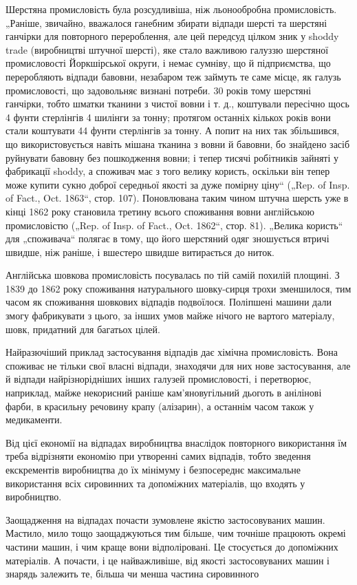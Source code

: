 
Шерстяна промисловість була розсудливіша, ніж льонообробна промисловість. „Раніше, звичайно,
вважалося ганебним
збирати відпади шерсті та шерстяні ганчірки для повторного
перероблення, але цей передсуд цілком зник у shoddy trade
(виробництві штучної шерсті), яке стало важливою галуззю
шерстяної промисловості Йоркшірської округи, і немає сумніву,
що й підприємства, що переробляють відпади бавовни, незабаром теж займуть те саме місце, як галузь
промисловості, що
задовольняє визнані потреби. 30 років тому шерстяні ганчірки,
тобто шматки тканини з чистої вовни і т. д., коштували пересічно щось 4 фунти стерлінгів 4 шилінги
за тонну; протягом
останніх кількох років вони стали коштувати 44 фунти стерлінгів за тонну. А попит на них так
збільшився, що використовується
навіть мішана тканина з вовни й бавовни, бо знайдено засіб
руйнувати бавовну без пошкодження вовни; і тепер тисячі робітників зайняті у фабрикації shoddy, а
споживач має з того
велику користь, оскільки він тепер може купити сукно доброї
середньої якості за дуже помірну ціну“ („Rep. of Insp. of Fact.,
Oct. 1863“, стор. 107). Поновлювана таким чином штучна шерсть
уже в кінці 1862 року становила третину всього споживання
вовни англійською промисловістю („Rep. of Insp. of Fact., Oct.
1862“, стор. 81). „Велика користь“ для „споживача“ полягає в тому,
що його шерстяний одяг зношується втричі швидше, ніж раніше,
і вшестеро швидше витирається до ниток.

Англійська шовкова промисловість посувалась по тій самій
похилій площині. З 1839 до 1862 року споживання натурального
шовку-сирця трохи зменшилося, тим часом як споживання шовкових відпадів подвоїлося. Поліпшені машини
дали змогу фабрикувати з цього, за інших умов майже нічого не вартого матеріалу, шовк, придатний для
багатьох цілей.

Найразючіший приклад застосування відпадів дає хімічна
промисловість. Вона споживає не тільки свої власні відпади,
знаходячи для них нове застосування, але й відпади найрізнорідніших інших галузей промисловості, і
перетворює, наприклад,
майже некорисний раніше кам’яновугільний дьоготь в анілінові
фарби, в красильну речовину крапу (алізарин), а останнім часом
також у медикаменти.

Від цієї економії на відпадах виробництва внаслідок повторного використання їм треба відрізняти
економію при утворенні
самих відпадів, тобто зведення екскрементів виробництва до
їх мінімуму і безпосереднє максимальне використання всіх сировинних та допоміжних матеріалів, що
входять у виробництво.

Заощадження на відпадах почасти зумовлене якістю застосовуваних машин. Мастило, мило тощо
заощаджуються тим
більше, чим точніше працюють окремі частини машин, і чим краще
вони відполіровані. Це стосується до допоміжних матеріалів.
А почасти, і це найважливіше, від якості застосовуваних машин
і знарядь залежить те, більша чи менша частина сировинного
\parbreak{}  %
